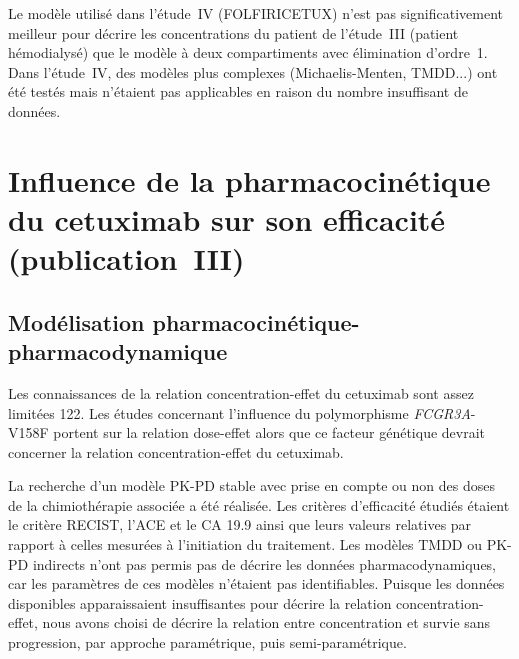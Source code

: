 Le modèle utilisé dans l'étude~IV (FOLFIRICETUX) n'est pas significativement meilleur pour décrire les concentrations du patient de l'étude~III (patient hémodialysé) que le modèle à deux compartiments avec élimination d'ordre~1. Dans l'étude~IV, des modèles plus complexes (Michaelis-Menten, TMDD...) ont été testés mais n'étaient pas applicables en raison du nombre insuffisant de données. 

\section{Influence de la pharmacocinétique du cetuximab sur son efficacité (publication~III)}
\subsection{Modélisation pharmacocinétique-pharmacodynamique}
Les connaissances de la relation concentration-effet du cetuximab sont assez limitées 122. Les études concernant l'influence du polymorphisme \textit{FCGR3A}-V158F portent sur la relation dose-effet alors que ce facteur génétique devrait concerner la relation concentration-effet du cetuximab.

La recherche d'un modèle PK-PD stable avec prise en compte ou non des doses de la chimiothérapie associée a été réalisée. Les critères d'efficacité étudiés étaient le critère RECIST, l'ACE et le CA 19.9 ainsi que leurs valeurs relatives par rapport à celles mesurées à l'initiation du traitement. Les modèles TMDD ou PK-PD indirects n'ont pas permis pas de décrire les données pharmacodynamiques, car les paramètres de ces modèles n'étaient pas identifiables. Puisque les données disponibles apparaissaient insuffisantes pour décrire la relation concentration-effet, nous avons choisi de décrire la relation entre concentration et survie sans progression, par approche paramétrique, puis semi-paramétrique.

